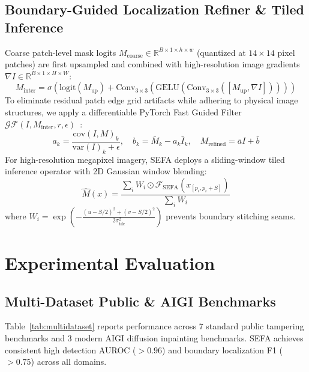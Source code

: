 \documentclass[10pt,journal,compsoc]{IEEEtran}
\begin{document}
\subsection{Boundary-Guided Localization Refiner \& Tiled Inference}
Coarse patch-level mask logits $M_{\text{coarse}} \in \mathbb{R}^{B \times 1 \times h \times w}$ (quantized at $14\times 14$ pixel patches) are first upsampled and combined with high-resolution image gradients $\nabla I \in \mathbb{R}^{B \times 1 \times H \times W}$:
\begin{equation}
    M_{\text{inter}} = \sigma\left(\text{logit}(M_{\text{up}}) + \text{Conv}_{3\times3}(\text{GELU}(\text{Conv}_{3\times3}([M_{\text{up}}, \nabla I])))\right)
\end{equation}
To eliminate residual patch edge grid artifacts while adhering to physical image structures, we apply a differentiable PyTorch Fast Guided Filter $\mathcal{GF}(I, M_{\text{inter}}, r, \epsilon)$~\cite{he2013guided}:
\begin{equation}
    a_k = \frac{\text{cov}(I, M)_k}{\text{var}(I)_k + \epsilon}, \quad b_k = \bar{M}_k - a_k \bar{I}_k, \quad M_{\text{refined}} = \bar{a} I + \bar{b}
\end{equation}
For high-resolution megapixel imagery, SEFA deploys a sliding-window tiled inference operator with 2D Gaussian window blending:
\begin{equation}
    \hat{M}(x) = \frac{\sum_i W_i \odot \mathcal{F}_{\text{SEFA}}(x_{[p_i, p_i + S]})}{\sum_i W_i}
\end{equation}
where $W_i = \exp(-\frac{(u - S/2)^2 + (v - S/2)^2}{2 \sigma_{\text{tile}}^2})$ prevents boundary stitching seams.

\section{Experimental Evaluation}

\subsection{Multi-Dataset Public & AIGI Benchmarks}
Table~\ref{tab:multidataset} reports performance across 7 standard public tampering benchmarks and 3 modern AIGI diffusion inpainting benchmarks. SEFA achieves consistent high detection AUROC ($>0.96$) and boundary localization F1 ($>0.75$) across all domains.
\end{document}
